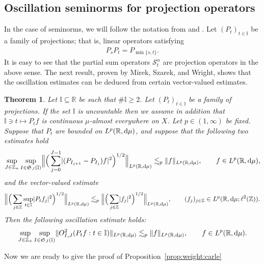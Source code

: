 \documentclass[11pt,oneside]{amsart}
\numberwithin{equation}{section}
\newtheorem{theorem}[equation]{Theorem}
\theoremstyle{definition}
\newcommand{\II}{\mathbb{I}}
\newcommand{\RR}{\mathbb{R}}
\newcommand{\ZZ}{\mathbb{Z}}
\newcommand{\calS}{\mathcal{S}}
\DeclarePairedDelimiter\abs{\lvert}{\rvert}
\DeclarePairedDelimiter\norm{\lVert}{\rVert}
\begin{document}
\subsection{Oscillation seminorms for projection operators}
In the case of seminorms, we will follow the notation from \cite{MSS} and \cite{MSW}. Let $(P_t)_{t \in \II}$ be a family of projections; that is, linear operators satisfying
\begin{align}\label{eq:10}
P_s P_t = P_{\min\{s,t\}}.
\end{align}
It is easy to see that the partial sum operators $\calS_t^\alpha$ are projection operators in the above sense. The next result, proven by Mirek, Szarek, and Wright, shows that the oscillation estimates can be deduced from certain vector-valued estimates.

\begin{theorem}{\cite[Theorem 3.1]{MSW}} \label{thm:p}
Let  $\II\subseteq \RR$ be such that $\#\II\ge2$. Let $(P_t)_{t \in \II}$ be a family of projections. If the set $\II$ is uncountable then we assume in addition that $\II\ni t\mapsto P_tf$ is
continuous $\mu$-almost everywhere on $X$. Let $p\in(1, \infty)$ be fixed. Suppose that
$P_t$ are bounded on $L^p(\RR,{\rm d}\mu)$, and suppose that the
following two estimates hold
\begin{align} \label{1.15}
\sup_{J\in\ZZ_+}\sup_{I\in \mathfrak{S}_J(\II)} 
\norm[\Big]{ \Big( \sum_{j=0}^{J-1} 
\abs{ (P_{I_{j+1}}- P_{I_{j}}) f}^2 \Big)^{1/2} }_{L^p(\RR,{\rm d}\mu)}
\lesssim_{p} 
\norm{f}_{L^p(\RR,{\rm d}\mu)}, \qquad f \in L^p(\RR,{\rm d}\mu),
\end{align}
and the vector-valued estimate
\begin{align} \label{1.2}
\norm[\Big]{ \Big( \sum_{j \in \ZZ} \sup_{t \in \II} \abs{P_{t} f_j}^2 \Big)^{1/2} }_{L^p(\RR,{\rm d}\mu)} 
\lesssim_{p} 
\norm[\Big]{ \Big( \sum_{j \in \ZZ} \abs{f_j}^2 \Big)^{1/2} }_{L^p(\RR,{\rm d}\mu)}, \qquad (f_j)_{j\in\ZZ}\in L^p(\RR,{\rm d}\mu;\ell^2(\ZZ)).
\end{align}
Then the following oscillation estimate holds: 
\begin{align} \label{1.3}
\sup_{J \in \ZZ_+} \sup_{ I \in \mathfrak S_{J}(\II) }
\norm{ O^2_{I, J} ( P_{t} f : t \in \II) }_{L^p(\RR,{\rm d}\mu)} 
\lesssim_{p}
\norm{ f }_{L^p(\RR,{\rm d}\mu)}, 
\qquad f \in L^p(\RR,{\rm d}\mu).
\end{align}
\end{theorem}
Now we are ready to give the proof of Proposition~\ref{prop:weight:carle}
\end{document}
